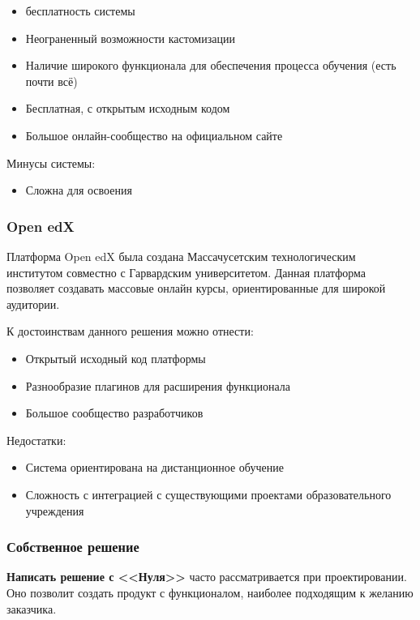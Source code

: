 \documentclass[a4paper,14pt]{article}
\begin{document}
\begin{itemize}
	\item бесплатность системы
	\item Неограненный возможности кастомизации
	\item Наличие широкого функционала для обеспечения процесса обучения (есть почти всё)
	\item Бесплатная, с открытым исходным кодом
	\item Большое онлайн-сообщество на официальном сайте
	
\end{itemize} 

Минусы системы:

\begin{itemize}
	\item Сложна для освоения	
\end{itemize} 


\subsubsection{Open edX} 

Платформа Open edX была создана Массачусетским технологическим институтом совместно с Гарвардским университетом.
Данная платформа позволяет создавать массовые онлайн курсы, ориентированные для широкой аудитории.

К достоинствам данного решения можно отнести:

\begin{itemize}
	\item Открытый исходный код платформы
	\item Разнообразие плагинов для расширения функционала
	\item Большое сообщество разработчиков
\end{itemize}

Недостатки:

\begin{itemize}
	\item Система ориентирована на дистанционное обучение
	\item Сложность с интеграцией с существующими проектами образовательного учреждения
\end{itemize}

\subsubsection{Собственное решение} 

\textbf{Написать решение с <<Нуля>>} часто рассматривается при проектировании.
Оно позволит создать продукт с функционалом, наиболее подходящим к желанию заказчика.
\end{document}
